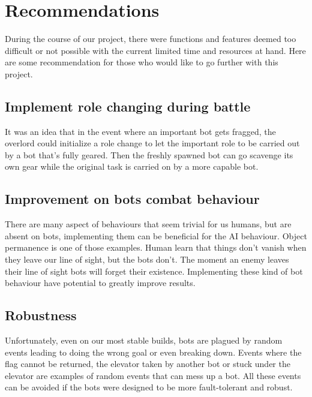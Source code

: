 \section{Recommendations}
During the course of our project, there were functions and features deemed too difficult or not possible with the current limited time and resources at hand. Here are some recommendation for those who would like to go further with this project.

\subsection{Implement role changing during battle}
It was an idea that in the event where an important bot gets fragged, the overlord could initialize a role change to let the important role to be carried out by a bot that’s fully geared. Then the freshly spawned bot can go scavenge its own gear while the original task is carried on by a more capable bot.

\subsection{Improvement on bots combat behaviour}
There are many aspect of behaviours that seem trivial for us humans, but are absent on bots, implementing them can be beneficial for the AI behaviour. Object permanence is one of those examples. Human learn that things don’t vanish when they leave our line of sight, but the bots don’t. The moment an enemy leaves their line of sight bots will forget their existence. Implementing these kind of bot behaviour have potential to greatly improve results.

\subsection{Robustness}
Unfortunately, even on our most stable builds, bots are plagued by random events leading to doing the wrong goal or even breaking down. Events where the flag cannot be returned, the elevator taken by another bot or stuck under the elevator are examples of random events that can mess up a bot. All these events can be avoided if the bots were designed to be more fault-tolerant and robust.

